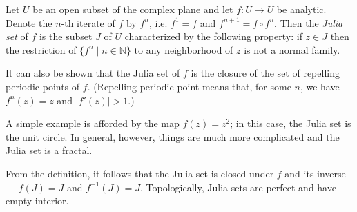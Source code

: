 \documentclass[12pt]{article}
\begin{document}
Let $U$ be an open subset of the complex plane and let $f \colon U \to U$
be analytic.  Denote the $n$-th iterate of $f$ by $f^n$, i.e. $f^1 = f$ 
and $f^{n+1} = f \circ f^n$.  Then the \emph{Julia set} of $f$ is the
subset $J$ of $U$ characterized by the following property: if $z \in J$
then the restriction of $\{f^n \mid n \in \mathbb{N}\}$ to any neighborhood
of $z$ is not a normal family.

It can also be shown that the Julia set of $f$ is the closure of the set of
repelling periodic points of $f$.  (Repelling periodic point means that, for
some $n$, we have $f^n (z) = z$ and $|f'(z)| > 1$.)

A simple example is afforded by the map $f(z) = z^2$; in this case, the Julia
set is the unit circle.  In general, however, things are much more complicated
and the Julia set is a fractal.

From the definition, it follows that the Julia set is closed under $f$ and
its inverse --- $f(J) = J$ and $f^{-1} (J) = J$.  Topologically, Julia sets
are perfect and have empty interior.


\end{document}
